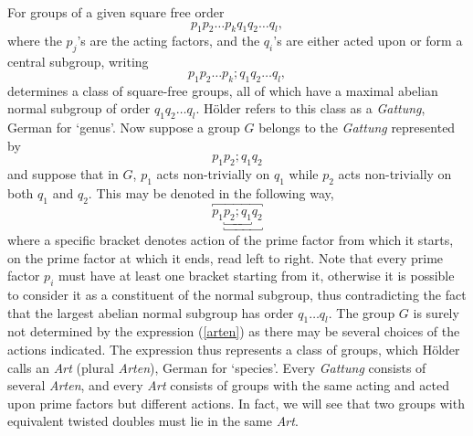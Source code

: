 \documentclass[a4paper, 10pt]{book}
\theoremstyle{definition}
\numberwithin{equation}{chapter}
\begin{document}
 For groups of a given square free order 
\begin{equation}\label{order}
	p_1p_2\dots p_kq_1q_2\dots q_l,\end{equation} 
  where the $p_j$'s are the acting factors, and the $q_i$'s are either acted upon or form a central subgroup, writing
 \begin{equation*}
  	p_1p_2\dots p_k;q_1q_2\dots q_l,
  \end{equation*} determines a class of square-free groups, all of which have a maximal abelian normal subgroup of order $q_1q_2\dots q_l$. H\"older refers to this class as a \textit{Gattung}, German for `genus'. 	 
  Now suppose a group $G$ belongs to the \textit{Gattung} represented by 
  \begin{equation*}
  	p_1p_2;q_1q_2
  \end{equation*}
and suppose that in $G$, $p_1$ acts non-trivially on $q_1$ while $p_2$ acts non-trivially on both $q_1$ and $q_2$. This may be denoted in the following way,
\begin{equation}\label{arten}
	\overbracket{p_1{\underbracket{\underbracket{p_2;q_1}q_2}}} 
\end{equation}
where a specific bracket denotes action of the prime factor from which it starts, on  the prime factor at which it ends, read left to right. Note that every prime factor $p_i$ must have at least one bracket starting from it, otherwise it is possible to consider it as a constituent of the normal subgroup, thus contradicting the fact that the largest abelian normal subgroup has order $q_1\dots q_l$. The group $G$ is surely not determined by the expression (\ref{arten}) as there may be several choices of the actions indicated. The expression thus represents a class of groups, which H\"older calls an \textit{Art} (plural \textit{Arten}), German for `species'. Every \textit{Gattung} consists of several \textit{Arten}, and every \textit{Art} consists of groups with the same acting and acted upon prime factors but different actions. In fact, we will see that two groups with equivalent twisted doubles must lie in the same \textit{Art}.
\end{document}
